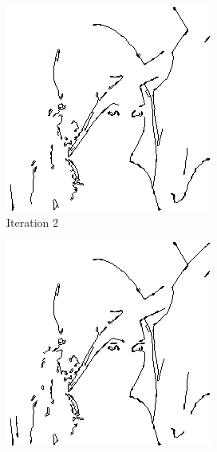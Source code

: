 \documentclass{llncs}
\begin{document}
\begin{figure}
        \vspace{5mm}
        
        \begin{subfigure}[b]{0.3\textwidth}
                \includegraphics[width=\textwidth]{IMG/ImprovedSearch/Iteration2}
                \caption{Iteration 2}
                \label{fig:search_iter2}
        \end{subfigure}%
        \quad
        \begin{subfigure}[b]{0.3\textwidth}
                \includegraphics[width=\textwidth]{IMG/ImprovedSearch/Iteration3}

\end{subfigure}
\end{figure}
\end{document}
